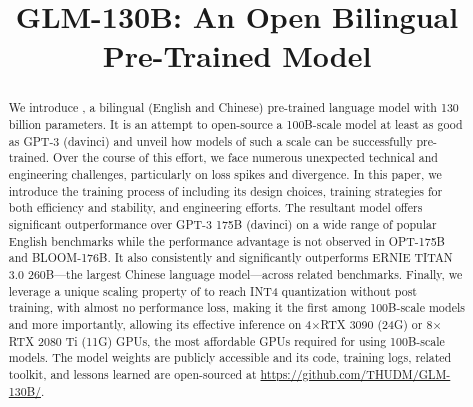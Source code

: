 \title{\icon GLM-130B: An Open Bilingual Pre-Trained Model}



\doparttoc
\faketableofcontents

\maketitle

\renewcommand{\thefootnote}{\fnsymbol{footnote}}
\renewcommand{\thefootnote}{\arabic{footnote}}

\begin{abstract}

We introduce \glm, a bilingual (English and Chinese) pre-trained language model with 130 billion parameters. 
It is an attempt to open-source a 100B-scale model at least as good as 
GPT-3 (davinci) and unveil how models of such a scale can be successfully pre-trained. 
Over the course of this effort, we face numerous unexpected technical and engineering challenges, particularly on loss spikes and divergence. 
In this paper, we introduce the training process of \glm including its design choices, training strategies for both efficiency and stability, and engineering efforts. 
The resultant \glm model offers significant outperformance over GPT-3 175B (davinci) on a wide range of popular English benchmarks while the performance advantage is not observed in OPT-175B and BLOOM-176B. 
It also consistently and significantly outperforms ERNIE TITAN 3.0 260B---the largest Chinese language model---across related benchmarks. 
Finally, we leverage a unique scaling property of \glm to reach INT4 quantization without post training, with almost no performance loss, making it the first among 100B-scale models and more importantly, allowing its effective inference on 4$\times$RTX 3090 (24G) or 8$\times$RTX 2080 Ti (11G) GPUs, the most affordable GPUs required for using 100B-scale models. 
The \glm model weights are publicly accessible and its code, training logs, related toolkit, and lessons learned are open-sourced at \url{https://github.com/THUDM/GLM-130B/}.
\end{abstract}

